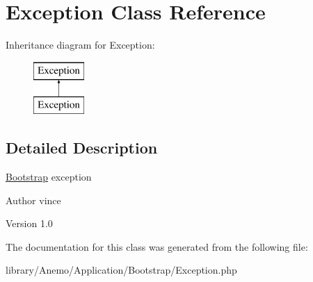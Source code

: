 \hypertarget{class_anemo_1_1_application_1_1_bootstrap_1_1_exception}{
\section{Exception Class Reference}
\label{class_anemo_1_1_application_1_1_bootstrap_1_1_exception}
}
Inheritance diagram for Exception:\begin{figure}[H]
\begin{center}
\leavevmode
\includegraphics[height=2.000000cm]{class_anemo_1_1_application_1_1_bootstrap_1_1_exception}
\end{center}
\end{figure}


\subsection{Detailed Description}
\hyperlink{namespace_anemo_1_1_application_1_1_bootstrap}{Bootstrap} exception \begin{DoxyAuthor}{Author}
vince 
\end{DoxyAuthor}
\begin{DoxyVersion}{Version}
1.0 
\end{DoxyVersion}


The documentation for this class was generated from the following file:\begin{DoxyCompactItemize}
\item 
library/Anemo/Application/Bootstrap/Exception.php\end{DoxyCompactItemize}
